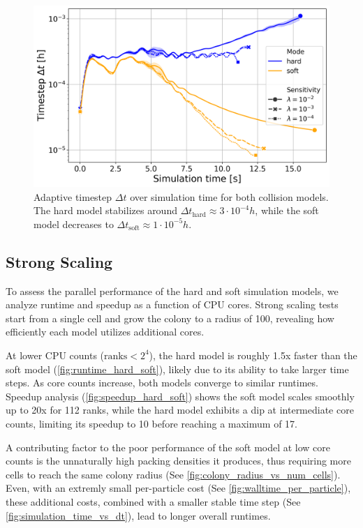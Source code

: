 \documentclass[conference]{IEEEtran}
\begin{document}
\begin{figure}[H]
    \centering
    \includegraphics[width=\linewidth]{figures/comparison_plots/combined_simulation_time [s]_vs_dt.png}
    \caption{Adaptive timestep $\Delta t$ over simulation time for both collision models. The hard model stabilizes around ${\Delta t}_{\text{hard}} \approx 3 \cdot 10^{-4} h$, while the soft model decreases to ${\Delta t}_{\text{soft}} \approx 1 \cdot 10^{-5} h$.} \label{fig:simulation_time_vs_dt}
\end{figure}


\subsection{Strong Scaling}
\label{sec:strong_scaling}

To assess the parallel performance of the hard and soft simulation models, we analyze runtime and speedup as a function of CPU cores. Strong scaling tests start from a single cell and grow the colony to a radius of 100, revealing how efficiently each model utilizes additional cores.

At lower CPU counts ($\text{ranks}< 2^4$), the hard model is roughly 1.5x faster than the soft model (\autoref{fig:runtime_hard_soft}), likely due to its ability to take larger time steps. As core counts increase, both models converge to similar runtimes. Speedup analysis (\autoref{fig:speedup_hard_soft}) shows the soft model scales smoothly up to 20x for 112 ranks, while the hard model exhibits a dip at intermediate core counts, limiting its speedup to 10 before reaching a maximum of 17.

A contributing factor to the poor performance of the soft model at low core counts is the unnaturally high packing densities it produces, thus requiring more cells to reach the same colony radius (See \autoref{fig:colony_radius_vs_num_cells}). Even, with an extremly small per-particle cost (See \autoref{fig:walltime_per_particle}), these additional costs, combined with a smaller stable time step (See \autoref{fig:simulation_time_vs_dt}), lead to longer overall runtimes.
\end{document}
